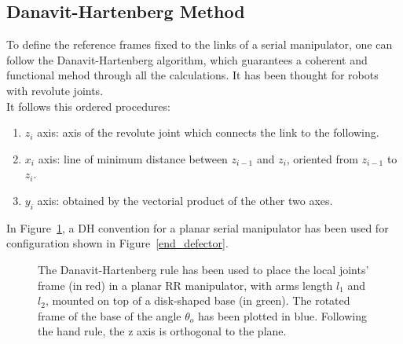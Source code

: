 \documentclass[a4paper,12pt,oneside]{report}
\begin{document}
\subsection{Danavit-Hartenberg Method}
To define the reference frames fixed to the links of a serial manipulator, one can follow the Danavit-Hartenberg algorithm, which guarantees a coherent and functional mehod through all the calculations. It has been thought for robots with revolute joints.\\
It follows this ordered procedures:
\begin{enumerate}
  \item $z_i$ axis: axis of the revolute joint which connects the link to the following.
  \item $x_i$ axis: line of minimum distance between $z_{i-1}$ and $z_i$, oriented from $z_{i-1}$ to $z_i$.
  \item $y_i$ axis: obtained by the vectorial product of the other two axes.
\end{enumerate}
In Figure~\ref{DH}, a DH convention for a planar serial manipulator has been used for configuration shown in Figure~\ref{end_defector}.
\begin{figure}[h]
  \centering
  
  \caption{The Danavit-Hartenberg rule has been used to place the local joints' frame (in red) in a planar RR manipulator, with arms length $l_1$ and $l_2$, mounted on top of a disk-shaped base (in green). The rotated frame of the base of the angle $\theta_o$ has been plotted in blue. Following the hand rule, the z axis is orthogonal to the plane.}
  \label{DH}
\end{figure}
\end{document}
